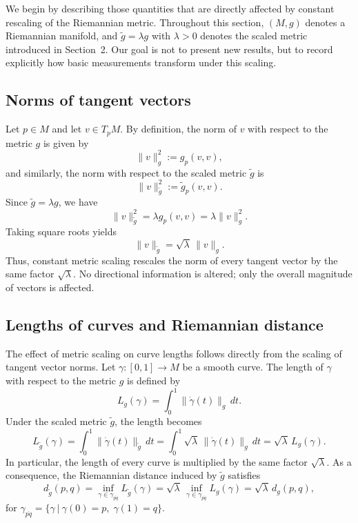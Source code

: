 \documentclass[11pt]{article}
\begin{document}
We begin by describing those quantities that are directly affected by constant rescaling of the Riemannian metric. Throughout this section, $(M,g)$ denotes a Riemannian manifold, and $\tilde g = \lambda g$ with $\lambda > 0$ denotes the scaled metric introduced in Section~2. Our goal is not to present new results, but to record explicitly how basic measurements transform under this scaling.

\subsection{Norms of tangent vectors}

Let $p \in M$ and let $v \in T_p M$. By definition, the norm of $v$ with respect to the metric $g$ is given by
\begin{equation*}
\|v\|_g^2 := g_p(v,v),    
\end{equation*}
and similarly, the norm with respect to the scaled metric $\tilde g$ is
\begin{equation*}
    \|v\|_{\tilde g}^2 := \tilde g_p(v,v).
\end{equation*}
Since $\tilde g = \lambda g$, we have
\begin{equation*}
\|v\|_{\tilde g}^2
= \lambda g_p(v,v)
= \lambda \|v\|_g^2.    
\end{equation*}
Taking square roots yields
\begin{equation*}
    \|v\|_{\tilde g} = \sqrt{\lambda}\,\|v\|_g.
\end{equation*}
Thus, constant metric scaling rescales the norm of every tangent vector by the same factor $\sqrt{\lambda}$. No directional information is altered; only the overall magnitude of vectors is affected.

\subsection{Lengths of curves and Riemannian distance}

The effect of metric scaling on curve lengths follows directly from the scaling
of tangent vector norms. Let $\gamma : [0,1] \to M$ be a smooth curve. The length
of $\gamma$ with respect to the metric $g$ is defined by
\[
L_g(\gamma)
= \int_0^1 \|\dot\gamma(t)\|_g \, dt.
\]
Under the scaled metric $\tilde g$, the length becomes
\[
L_{\tilde g}(\gamma)
= \int_0^1 \|\dot\gamma(t)\|_{\tilde g} \, dt
= \int_0^1 \sqrt{\lambda}\,\|\dot\gamma(t)\|_g \, dt
= \sqrt{\lambda}\, L_g(\gamma).
\]
In particular, the length of every curve is multiplied by the same factor
$\sqrt{\lambda}$. As a consequence, the Riemannian distance induced by $\tilde g$
satisfies
\[
d_{\tilde g}(p,q)
= \inf_{\gamma \in \gamma_{\overline{pq}}} L_{\tilde g}(\gamma)
= \sqrt{\lambda}\,
\inf_{\gamma \in \gamma_{\overline{pq}}} L_g(\gamma)
= \sqrt{\lambda}\, d_g(p,q),
\]
for $\gamma_{\overline{pq}} = \lbrace\gamma~\vert~\gamma(0)=p, \; \gamma(1)=q\rbrace$.
\end{document}
